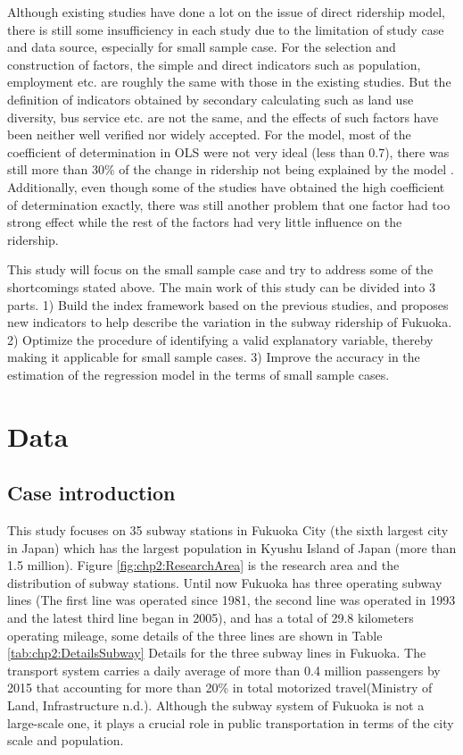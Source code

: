 Although existing studies have done a lot on the issue of direct ridership model, there is still some insufficiency in each study due to the limitation of study case and data source, especially for small sample case. For the selection and construction of factors, the simple and direct indicators such as population, employment etc. are roughly the same with those in the existing studies. But the definition of indicators obtained by secondary calculating such as land use diversity, bus service etc. are not the same, and the effects of such factors have been neither well verified nor widely accepted. For the model, most of the coefficient of determination in OLS were not very ideal (less than 0.7), there was still more than 30\% of the change in ridership not being explained by the model \cite{gutierrez2011transit,jun2015land}. Additionally, even though some of the studies have obtained the high coefficient of determination exactly, there was still another problem that one factor had too strong effect while the rest of the factors had very little influence on the ridership.

This study will focus on the small sample case and try to address some of the shortcomings stated above. The main work of this study can be divided into 3 parts. 1) Build the index framework based on the previous studies, and proposes new indicators to help describe the variation in the subway ridership of Fukuoka. 2) Optimize the procedure of identifying a valid explanatory variable, thereby making it applicable for small sample cases. 3) Improve the accuracy in the estimation of the regression model in the terms of small sample cases.

\section{Data}
\subsection{Case introduction}
%
This study focuses on 35 subway stations in Fukuoka City (the sixth largest city in Japan) which has the largest population in Kyushu Island of Japan (more than 1.5 million). Figure \ref{fig:chp2:ResearchArea} is the research area and the distribution of subway stations. Until now Fukuoka has three operating subway lines (The first line was operated since 1981, the second line was operated in 1993 and the latest third line began in 2005), and has a total of 29.8 kilometers operating mileage, some details of the three lines are shown in Table \ref{tab:chp2:DetailsSubway} Details for the three subway lines in Fukuoka. The transport system carries a daily average of more than 0.4 million passengers by 2015 that accounting for more than 20\% in total motorized travel(Ministry of Land, Infrastructure n.d.). Although the subway system of Fukuoka is not a large-scale one, it plays a crucial role in public transportation in terms of the city scale and population.

